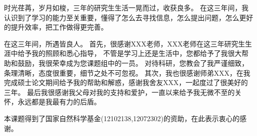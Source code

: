 \begin{acknowledgements}
时光荏苒，岁月如梭，三年的研究生生活一晃而过，收获良多。
在这三年间，我认识到了学习的能力至关重要，懂得了怎么去寻找信息，怎么提出问题，怎么更好的提升效率，把工作做得更完善。

在这三年间，所遇皆良人。
首先，很感谢XXX老师，XXX老师在这三年研究生生涯中给予我的照顾和悉心指导，
不管是学习上还是生活中，您都给予了我很大帮助和鼓励，我很荣幸成为您课题组中的一员。
对待科研，您教会了我严谨细致，条理清晰，态度很重要，细节之处不可忽视。
其次，我也很感谢师弟XXX，在我完成硕士论文期间给予我的帮助和解惑，感谢我舍友XXX，一起度过了很美好的三年。
最后我很感谢我父母对我的支持和爱护，一直以来给予我无微不至的关怀，永远都是我最有力的后盾。

本课题得到了国家自然科学基金(12102138,12072302)的资助，在此表示衷心的感谢。
\end{acknowledgements}
